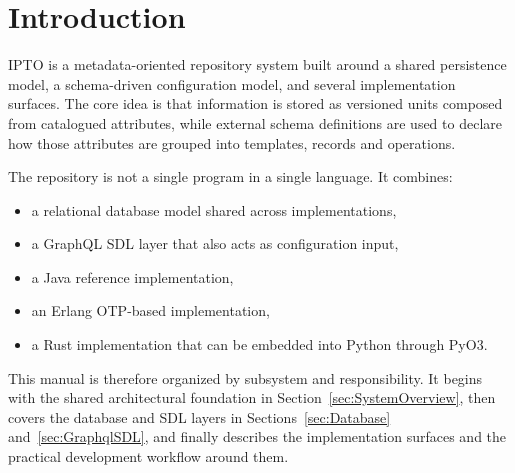 \section{Introduction}

IPTO is a metadata-oriented repository system built around a shared persistence model, a schema-driven configuration model, and several implementation surfaces. The core idea is that information is stored as versioned units composed from catalogued attributes, while external schema definitions are used to declare how those attributes are grouped into templates, records and operations.

The repository is not a single program in a single language. It combines:
\begin{itemize}
\item a relational database model shared across implementations,
\item a GraphQL SDL layer that also acts as configuration input,
\item a Java reference implementation,
\item an Erlang OTP-based implementation,
\item a Rust implementation that can be embedded into Python through PyO3.
\end{itemize}

This manual is therefore organized by subsystem and responsibility. It begins with the shared architectural foundation in Section~\ref{sec:SystemOverview}, then covers the database and SDL layers in Sections~\ref{sec:Database} and~\ref{sec:GraphqlSDL}, and finally describes the implementation surfaces and the practical development workflow around them.

